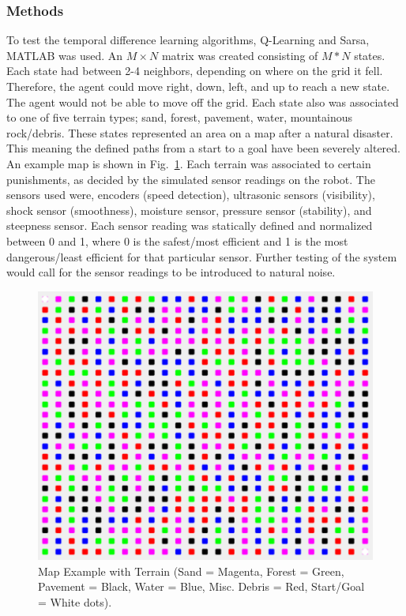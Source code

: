 \documentclass[12pt,american]{report}
\providecommand{\DIFaddtex}[1]{{\protect\color{blue}\uwave{#1}}} %
\providecommand{\DIFaddbegin}{} %
\providecommand{\DIFaddend}{} %
\providecommand{\DIFadd}[1]{\texorpdfstring{\DIFaddtex{#1}}{#1}} %
\newcommand{\DIFaddincludegraphics}[2][]{{\color{blue}\fbox{\DIFOincludegraphics[#1]{#2}}}} %
\DeclareRobustCommand{\DIFaddbegin}{\DIFOaddbegin \let\includegraphics\DIFaddincludegraphics} %
\DeclareRobustCommand{\DIFaddend}{\DIFOaddend \let\includegraphics\DIFOincludegraphics} %
\begin{document}
\subsubsection{Methods}

To test the temporal difference learning algorithms, Q-Learning and Sarsa, MATLAB was used. An $M\times N$ matrix was created consisting of $M*N$ states.  Each state had between 2-4 neighbors, depending on where on the grid it fell. Therefore, the agent could move right, down, left, and up to reach a new state. The agent would not be able to move off the grid. Each state also was associated to one of five terrain types; sand, forest, pavement, water, \DIFaddbegin \DIFadd{or }\DIFaddend mountainous rock/debris.  These states represented an area on a map after a natural disaster.  This meaning the defined paths from a start to a goal have been severely altered. An example map is shown in Fig.~\ref{fig:map-example}. Each terrain was associated to certain punishments, as decided by the simulated sensor readings on the robot.  The sensors used were, encoders (speed detection), ultrasonic sensors (visibility), shock sensor (smoothness), moisture sensor, pressure sensor (stability), and steepness sensor.  Each sensor reading was statically defined and normalized between 0 and 1, where 0 is the safest/most efficient and 1 is the most dangerous/least efficient for that particular sensor. Further testing of the system would call for the sensor readings to be introduced to natural noise.

\begin{figure}
\centering
\includegraphics[scale=1.5]{images/map-example.PNG}
\caption{Map Example with Terrain (Sand = Magenta, Forest = Green, Pavement = Black, Water = Blue, Misc. Debris = Red, Start/Goal = White dots).}
\label{fig:map-example}
\end{figure}
\end{document}
